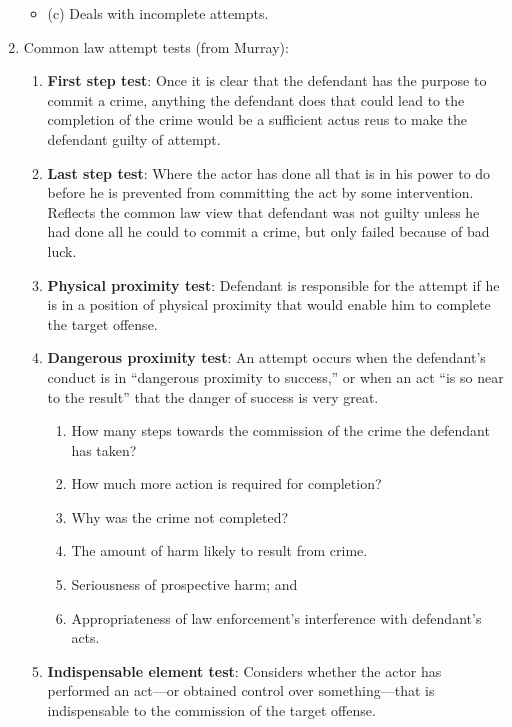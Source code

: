 \begin{enumerate}
\begin{itemize}
        \item (c) Deals with incomplete attempts.
    \end{itemize}
    \item Common law attempt tests (from Murray):
    \begin{enumerate}
        \item \textbf{First step test}: Once it is clear that the defendant 
        has the purpose to commit a crime, anything the defendant does that 
        could lead to the completion of the crime would be a sufficient actus 
        reus to make the defendant guilty of attempt.
        \item \textbf{Last step test}: Where the actor has done all that is in 
        his power to do before he is prevented from committing the act by some 
        intervention. Reflects the common law view that defendant was not 
        guilty unless he had done all he could to commit a crime, but only 
        failed because of bad luck.
        \item \textbf{Physical proximity test}: Defendant is responsible for 
        the attempt if he is in a position of physical proximity that would 
        enable him to complete the target offense.
        \item \textbf{Dangerous proximity test}: An attempt occurs when the 
        defendant's conduct is in ``dangerous proximity to success,'' or when 
        an act ``is so near to the result'' that the danger of success is very 
        great.
        \begin{enumerate}
            \item How many steps towards the commission of the crime the 
            defendant has taken?
            \item How much more action is required for completion?
            \item Why was the crime not completed?
            \item The amount of harm likely to result from crime.
            \item Seriousness of prospective harm; and 
            \item Appropriateness of law enforcement's interference with defendant's acts.
        \end{enumerate}
        \item \textbf{Indispensable element test}: Considers whether the actor 
        has performed an act---or obtained control over something---that is 
        indispensable to the commission of the target offense. 

\end{enumerate}
\end{enumerate}
